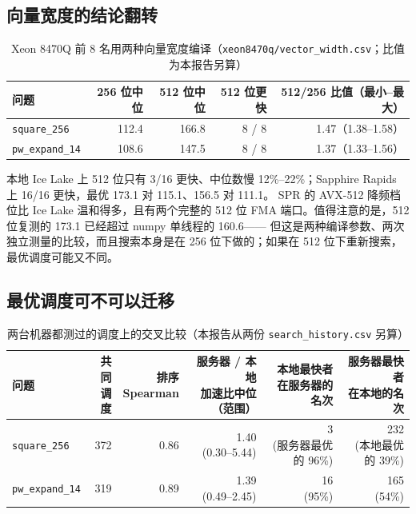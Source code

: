 \documentclass[11pt,a4paper]{ctexart}
\newcommand{\sk}[1]{\texttt{#1}}
\begin{document}
\subsection{向量宽度的结论翻转}

\begin{table}[H]
\centering\small
\caption{Xeon 8470Q 前 8 名用两种向量宽度编译（\texttt{xeon8470q/vector\_width.csv}；比值为本报告另算）}\label{tab:xeonwidth}
\begin{tabular}{lrrrr}
\toprule
问题 & 256 位中位 & 512 位中位 & 512 位更快 & 512/256 比值（最小--最大） \\
\midrule
\sk{square\_256} & 112.4 & 166.8 & 8 / 8 & 1.47（1.38--1.58） \\
\sk{pw\_expand\_14} & 108.6 & 147.5 & 8 / 8 & 1.37（1.33--1.56） \\
\bottomrule
\end{tabular}
\end{table}

本地 Ice Lake 上 512 位只有 3/16 更快、中位数慢 12\%--22\%；Sapphire Rapids 上 16/16 更快，最优 173.1 对 115.1、156.5 对 111.1。
SPR 的 AVX-512 降频档位比 Ice Lake 温和得多，且有两个完整的 512 位 FMA 端口。值得注意的是，512 位复测的 173.1 已经超过 numpy 单线程的 160.6——
但这是两种编译参数、两次独立测量的比较，而且搜索本身是在 256 位下做的；如果在 512 位下重新搜索，最优调度可能又不同。

\subsection{最优调度可不可以迁移}

\begin{table}[H]
\centering\small
\caption{两台机器都测过的调度上的交叉比较（本报告从两份 \texttt{search\_history.csv} 另算）}\label{tab:cross}
\setlength{\tabcolsep}{4pt}
\begin{tabular}{lrrrrr}
\toprule
问题 & \makecell[r]{共同\\调度} & \makecell[r]{排序\\Spearman} & \makecell[r]{服务器 / 本地\\加速比中位（范围）} & \makecell[r]{本地最快者\\在服务器的名次} & \makecell[r]{服务器最快者\\在本地的名次} \\
\midrule
\sk{square\_256} & 372 & 0.86 & \makecell[r]{1.40\\(0.30--5.44)} & \makecell[r]{3\\(服务器最优的 96\%)} & \makecell[r]{232\\(本地最优的 39\%)} \\
\addlinespace
\sk{pw\_expand\_14} & 319 & 0.89 & \makecell[r]{1.39\\(0.49--2.45)} & \makecell[r]{16\\(95\%)} & \makecell[r]{165\\(54\%)} \\
\bottomrule
\end{tabular}
\end{table}
\end{document}
